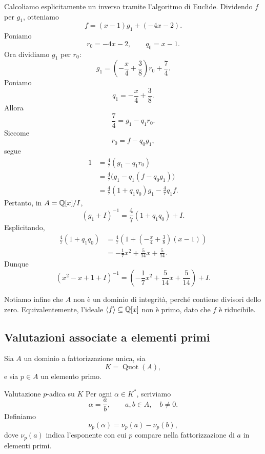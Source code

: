 \documentclass[a4paper]{article}
\begin{document}
\begin{radioactive}
\begin{snippetsolution}{}
    Calcoliamo esplicitamente un inverso tramite l'algoritmo di Euclide.
    Dividendo \(f\) per \(g_1\), otteniamo
    \[
        f=(x-1)g_1+(-4x-2).
    \]
    Poniamo
    \[
        r_0=-4x-2,
        \qquad
        q_0=x-1.
    \]
    Ora dividiamo \(g_1\) per \(r_0\):
    \[
        g_1=\left(-\frac{x}{4}+\frac{3}{8}\right)r_0+\frac{7}{4}.
    \]
    Poniamo
    \[
        q_1=-\frac{x}{4}+\frac{3}{8}.
    \]
    Allora
    \[
        \frac{7}{4}=g_1-q_1r_0.
    \]
    Siccome
    \[
        r_0=f-q_0g_1,
    \]
    segue
    \begin{align*}
        1
        &=
        \frac{4}{7}(g_1-q_1r_0) \\
        &=
        \frac{4}{7}\big(g_1-q_1(f-q_0g_1)\big) \\
        &=
        \frac{4}{7}(1+q_1q_0)g_1-\frac{4}{7}q_1f.
    \end{align*}
    Pertanto, in \(A=\mathbb{Q}[x]/I\),
    \[
        (g_1+I)^{-1}
        =
        \frac{4}{7}(1+q_1q_0)+I.
    \]
    Esplicitando,
    \begin{align*}
        \frac{4}{7}(1+q_1q_0)
        &=
        \frac{4}{7}\left(1+\left(-\frac{x}{4}+\frac{3}{8}\right)(x-1)\right) \\
        &=
        -\frac{1}{7}x^2+\frac{5}{14}x+\frac{5}{14}.
    \end{align*}
    Dunque
    \[
        (x^2-x+1+I)^{-1}
        =
        \left(-\frac{1}{7}x^2+\frac{5}{14}x+\frac{5}{14}\right)+I.
    \]

    Notiamo infine che \(A\) non è un dominio di integrità, perché contiene divisori dello zero. Equivalentemente, l'ideale \(\langle f \rangle\subseteq \mathbb{Q}[x]\) non è primo, dato che \(f\) è riducibile.
\end{snippetsolution}
\end{radioactive}

\subsection{Valutazioni associate a elementi primi}

\begin{radioactive}
Sia \(A\) un dominio a fattorizzazione unica, sia
\[
    K=\operatorname{Quot}(A),
\]
e sia \(p\in A\) un elemento primo.
\end{radioactive}

\begin{radioactive}
\begin{snippetdefinition}{Valutazione \(p\)-adica su \(K\)}
    Per ogni \(\alpha\in K^\ast\), scriviamo
    \[
        \alpha=\frac{a}{b},
        \qquad
        a,b\in A,
        \quad
        b\neq 0.
    \]
    Definiamo
    \[
        \nu_p(\alpha)=\nu_p(a)-\nu_p(b),
    \]
    dove \(\nu_p(a)\) indica l'esponente con cui \(p\) compare nella fattorizzazione di \(a\) in elementi primi.
\end{snippetdefinition}
\end{radioactive}
\end{document}
